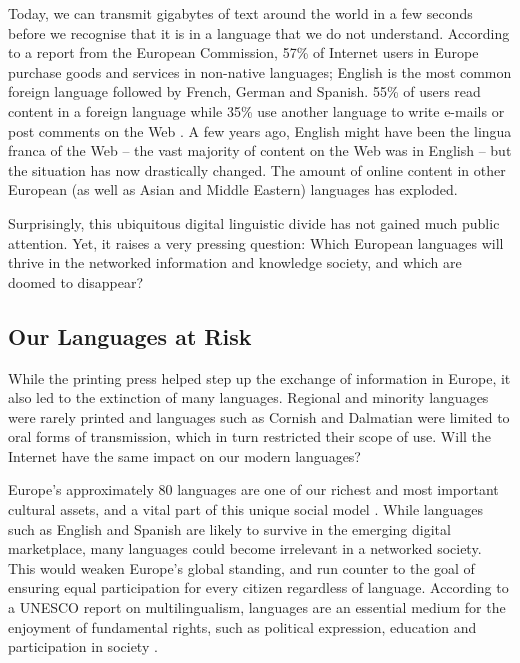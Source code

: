 {\begin{multicols}{2}

Today, we can transmit gigabytes of text around the world in a few seconds before we recognise that it is in a language that we do not understand. According to a report from the European Commission, 57\% of Internet users in Europe purchase goods and services in non-native languages; English is the most common foreign language followed by French, German and Spanish. 55\% of users read content in a foreign language while 35\% use another language to write e-mails or post comments on the Web \cite{EC1}. A few years ago, English might have been the lingua franca of the Web -- the vast majority of content on the Web was in English -- but the situation has now drastically changed. The amount of online content in other European (as well as Asian and Middle Eastern) languages has exploded.

Surprisingly, this ubiquitous digital linguistic divide has not gained much public attention. Yet, it raises a very pressing question: Which European languages will thrive in the networked information and knowledge society, and which are doomed to disappear?


\subsection{Our Languages at Risk}

While the printing press helped step up the exchange of information in Europe, it also led to the extinction of many languages. Regional and minority languages were rarely printed and languages such as Cornish and Dalmatian were limited to oral forms of transmission, which in turn restricted their scope of use. Will the Internet have the same impact on our modern languages?


Europe’s approximately 80 languages are one of our richest and most important cultural assets, and a vital part of this unique social model \cite{EC2}. While languages such as English and Spanish are likely to survive in the emerging digital marketplace, many languages could become irrelevant in a networked society. This would weaken Europe’s global standing, and run counter to the goal of ensuring equal participation for every citizen regardless of language. According to a UNESCO report on multilingualism, languages are an essential medium for the enjoyment of fundamental rights, such as political expression, education and participation in society \cite{Unesco1}.


\end{multicols}}
